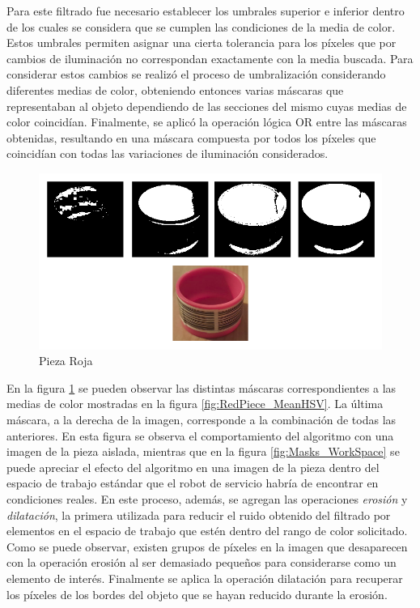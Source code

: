 Para este filtrado fue necesario establecer los umbrales superior e inferior dentro de los cuales se considera que se cumplen las condiciones de la media de color. Estos umbrales permiten asignar una cierta tolerancia para los píxeles que por cambios de iluminación no correspondan exactamente con la media buscada. Para considerar estos cambios se realizó el proceso de umbralización considerando diferentes medias de color, obteniendo entonces varias máscaras que representaban al objeto dependiendo de las secciones del mismo cuyas medias de color coincidían. Finalmente, se aplicó la operación lógica OR entre las máscaras obtenidas, resultando en una máscara compuesta por todos los píxeles que coincidían con todas las variaciones de iluminación considerados.

\begin{figure}[H]
\centering
\includegraphics[scale= 0.35]{Figures/Masks_Piece.png}
    \caption{Pieza Roja}
    \label{fig:Masks_RedPiece}
\end{figure}

En la figura \ref{fig:Masks_RedPiece} se pueden observar las distintas máscaras correspondientes a las medias de color mostradas en la figura \ref{fig:RedPiece_MeanHSV}. La última máscara, a la derecha de la imagen, corresponde a la combinación de todas las anteriores. En esta figura se observa el comportamiento del algoritmo con una imagen de la pieza aislada, mientras que en la figura \ref{fig:Masks_WorkSpace} se puede apreciar el efecto del algoritmo en una imagen de la pieza dentro del espacio de trabajo estándar que el robot de servicio habría de encontrar en condiciones reales. En este proceso, además, se agregan las operaciones \textit{erosión} y \textit{dilatación}, la primera utilizada para reducir el ruido obtenido del filtrado por elementos en el espacio de trabajo que estén dentro del rango de color solicitado. Como se puede observar, existen grupos de píxeles en la imagen que desaparecen con la operación erosión al ser demasiado pequeños para considerarse como un elemento de interés. Finalmente se aplica la operación dilatación para recuperar los píxeles  de los bordes del objeto que se hayan reducido durante la erosión. 

